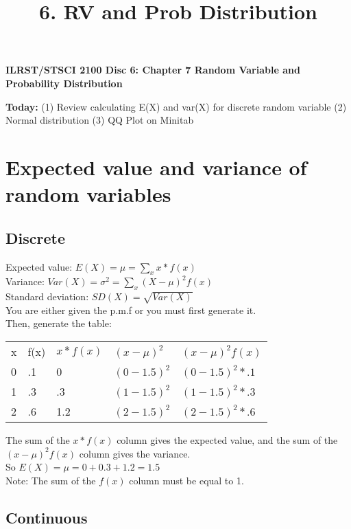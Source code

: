 \documentclass[12pt]{article}
\begin{document}
\title{6. RV and Prob Distribution}
\begin{center} \textbf{ILRST/STSCI 2100 Disc 6: Chapter 7 Random Variable and Probability Distribution }
\end{center}

\noindent \textbf{Today: }(1) Review calculating E(X) and var(X) for discrete random variable (2) Normal distribution (3) QQ Plot on Minitab  


\section{Expected value and variance of random variables}
\subsection{Discrete}

Expected value: $E(X) = \mu = \sum_x x*f(x)$ \\

\noindent Variance: $Var(X) = \sigma^2 = \sum_x (X - \mu)^2f(x)$ \\

\noindent Standard deviation: $SD(X) = \sqrt{Var(X)}$\\

\noindent You are either given the p.m.f or you must first generate it.\\
\noindent Then, generate the table: \\

\begin{tabular}{l|l|l|l|l}
x & f(x) & $x*f(x)$ & $(x-\mu)^2$ & $(x-\mu)^2f(x)$ \\
0 & .1   & 0      & $(0-1.5)^2$ & $(0-1.5)^2*.1$   \\
1 & .3   & .3     & $(1-1.5)^2$ & $(1-1.5)^2*.3$   \\
2 & .6   & 1.2    & $(2-1.5)^2$ & $(2-1.5)^2*.6$  
\end{tabular} 

\vspace{0.5 cm}

\noindent The sum of the $x*f(x)$ column gives the expected value, and the sum of the $(x-\mu)^2f(x)$ column gives the variance. \\

\noindent So $E(X) = \mu = 0 + 0.3 + 1.2 = 1.5$\\

\noindent Note: The sum of the $f(x)$ column must be equal to 1.

\subsection{Continuous}
\end{document}
